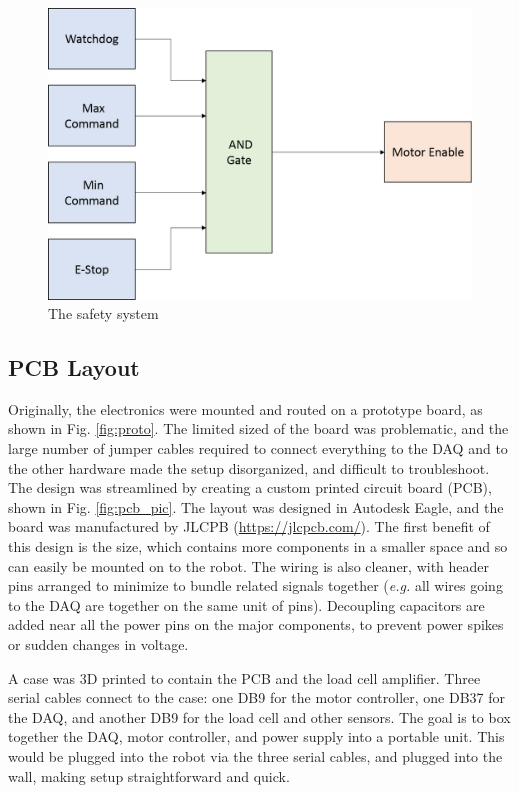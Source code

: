 \documentclass[12pt]{report}
\begin{document}
\begin{itemize}
	\begin{figure}[h] 
		\centering
		\includegraphics[width=0.6\linewidth]{electronics_safety}
		\caption{The safety system}
		\label{fig:safety}
	\end{figure}	
	 
	\end{itemize}

		
		\subsection{PCB Layout}
		
		Originally, the electronics were mounted and routed on a prototype board, as shown in Fig. \ref{fig:proto}. The limited sized of the board was problematic, and the large number of jumper cables required to connect everything to the DAQ and to the other hardware made the setup disorganized, and difficult to troubleshoot. The design was streamlined by creating a custom printed circuit board (PCB), shown in Fig. \ref{fig:pcb_pic}. The layout was designed in Autodesk Eagle, and the board was manufactured by JLCPB (\url{https://jlcpcb.com/}). The first benefit of this design is the size, which contains more components in a smaller space and so can easily be mounted on to the robot. The wiring is also cleaner, with header pins arranged to minimize to bundle related signals together (\textit{e.g.} all wires going to the DAQ are together on the same unit of pins). Decoupling capacitors are added near all the power pins on the major components, to prevent power spikes or sudden changes in voltage.
		
		A case was 3D printed to contain the PCB and the load cell amplifier. Three serial cables connect to the case: one DB9 for the motor controller, one DB37 for the DAQ, and another DB9 for the load cell and other sensors. The goal is to box together the DAQ, motor controller, and power supply into a portable unit. This would be plugged into the robot via the three serial cables, and plugged into the wall, making setup straightforward and quick. 
		
\end{document}
